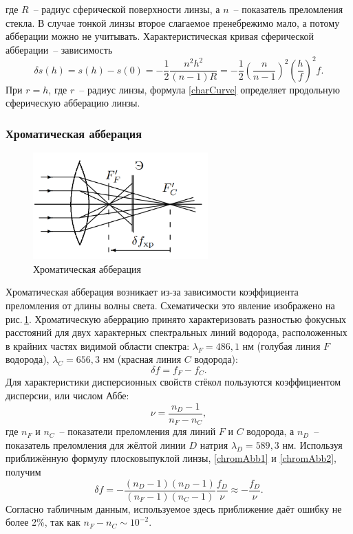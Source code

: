 \documentclass[a4paper,12pt]{article} %
\begin{document}
где $R$~-- радиус сферической поверхности линзы, а $n$~-- показатель преломления стекла. В случае тонкой линзы второе слагаемое пренебрежимо мало, а потому абберации можно не учитывать. Характеристическая кривая сферической абберации~-- зависимость
\begin{equation}\label{charCurve}
    \delta s(h) = s(h)-s(0) = -\frac{1}{2}\frac{n^2h^2}{(n-1)R} = -\frac{1}{2}\left(\frac{n}{n-1}\right)^2\left(\frac{h}{f}\right)^2f.
\end{equation}
При $r=h$, где $r$~-- радиус линзы, формула \eqref{charCurve} определяет продольную сферическую абберацию линзы.

\subsubsection*{Хроматическая абберация}

\begin{figure}[h]
    \centering
    \includegraphics[width=0.6\textwidth]{chromAbberation.png}
    \caption{Хроматическая абберация}
    \label{fig:chromAbberation}
\end{figure}

Хроматическая абберация возникает из-за зависимости коэффициента преломления от длины волны света. Схематически это явление изображено на рис.\,\ref{fig:chromAbberation}. Хроматическую аберрацию принято характеризовать разностью фокусных расстояний для двух характерных спектральных линий водорода, расположенных в крайних частях видимой области спектра: $\lambda_F = 486,1$ нм (голубая линия $F$ водорода), $\lambda_C = 656,3$ нм (красная линия $C$ водорода):
\begin{equation}\label{chromAbb1}
    \delta f = f_F - f_C.
\end{equation}
Для характеристики дисперсионных свойств стёкол пользуются коэффициентом дисперсии, или числом Аббе:
\begin{equation}\label{chromAbb2}
    \nu = \frac{n_D - 1}{n_F - n_C},
\end{equation}
где $n_F$ и $n_C$~-- показатели преломления для линий $F$ и $C$ водорода, а $n_D$~-- показатель преломления для жёлтой линии $D$ натрия $\lambda_D = 589,3$ нм. Используя приближённую формулу плосковыпуклой линзы, \eqref{chromAbb1} и \eqref{chromAbb2}, получим
\begin{equation}
    \delta f = -\frac{(n_D - 1)(n_D - 1)}{(n_F - 1)(n_C - 1)}\frac{f_D}{\nu}\approx -\frac{f_D}{\nu}.
\end{equation}
Согласно табличным данным, используемое здесь приближение даёт ошибку не более 2\%, так как $n_F - n_C \sim 10^{-2}$.
\end{document}
